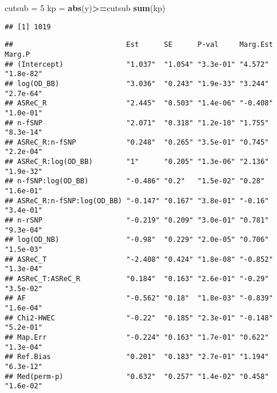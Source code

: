 \documentclass[]{article}
\newenvironment{Shaded}{\begin{snugshade}}{\end{snugshade}}
\newcommand{\KeywordTok}[1]{\textcolor[rgb]{0.13,0.29,0.53}{\textbf{#1}}}
\newcommand{\DecValTok}[1]{\textcolor[rgb]{0.00,0.00,0.81}{#1}}
\newcommand{\StringTok}[1]{\textcolor[rgb]{0.31,0.60,0.02}{#1}}
\newcommand{\OperatorTok}[1]{\textcolor[rgb]{0.81,0.36,0.00}{\textbf{#1}}}
\newcommand{\NormalTok}[1]{#1}
\begin{document}
\begin{Shaded}
\begin{Highlighting}[]
\NormalTok{cutsub =}\StringTok{ }\DecValTok{5}
\NormalTok{kp =}\StringTok{ }\KeywordTok{abs}\NormalTok{(y)}\OperatorTok{>=}\NormalTok{cutsub}
\KeywordTok{sum}\NormalTok{(kp)}
\end{Highlighting}
\end{Shaded}

\begin{verbatim}
## [1] 1019
\end{verbatim}

\begin{Shaded}
\end{Shaded}

\begin{verbatim}
##                           Est      SE      P-val     Marg.Est Marg.P   
## (Intercept)               "1.037"  "1.054" "3.3e-01" "4.572"  "1.8e-82"
## log(OD_BB)                "3.036"  "0.243" "1.9e-33" "3.244"  "2.7e-64"
## ASReC_R                   "2.445"  "0.503" "1.4e-06" "-0.408" "1.0e-01"
## n-fSNP                    "2.071"  "0.318" "1.2e-10" "1.755"  "8.3e-14"
## ASReC_R:n-fSNP            "0.248"  "0.265" "3.5e-01" "0.745"  "2.2e-04"
## ASReC_R:log(OD_BB)        "1"      "0.205" "1.3e-06" "2.136"  "1.9e-32"
## n-fSNP:log(OD_BB)         "-0.486" "0.2"   "1.5e-02" "0.28"   "1.6e-01"
## ASReC_R:n-fSNP:log(OD_BB) "-0.147" "0.167" "3.8e-01" "-0.16"  "3.4e-01"
## n-rSNP                    "-0.219" "0.209" "3.0e-01" "0.781"  "9.3e-04"
## log(OD_NB)                "-0.98"  "0.229" "2.0e-05" "0.706"  "1.5e-03"
## ASReC_T                   "-2.408" "0.424" "1.8e-08" "-0.852" "1.3e-04"
## ASReC_T:ASReC_R           "0.184"  "0.163" "2.6e-01" "-0.29"  "3.5e-02"
## AF                        "-0.562" "0.18"  "1.8e-03" "-0.839" "1.6e-04"
## Chi2-HWEC                 "-0.22"  "0.185" "2.3e-01" "-0.148" "5.2e-01"
## Map.Err                   "-0.224" "0.163" "1.7e-01" "0.622"  "1.3e-04"
## Ref.Bias                  "0.201"  "0.183" "2.7e-01" "1.194"  "6.3e-12"
## Med(perm-p)               "0.632"  "0.257" "1.4e-02" "0.458"  "1.6e-02"
\end{verbatim}

\begin{Shaded}
\end{Shaded}
\end{document}
